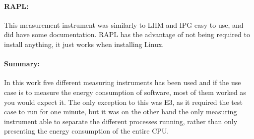 \paragraph*{RAPL:} This measurement instrument was similarly to LHM and IPG easy to use, and did have some documentation. RAPL has the advantage of not being required to install anything, it just works when installing Linux.

\paragraph*{Summary:} In this work five different measuring instruments has been used and if the use case is to measure the energy consumption of software, most of them worked as you would expect it. The only exception to this was E3, as it required the test case to run for one minute, but it was on the other hand the only measuring instrument able to separate the different processes running, rather than only presenting the energy consumption of the entire CPU. 